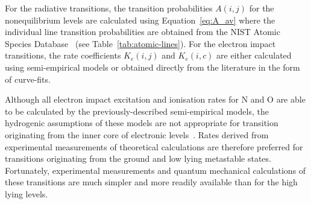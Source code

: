 {For the radiative transitions, the transition probabilities $A(i,j)$ for the nonequilibrium levels are calculated using Equation~\ref{eq:A_av} where the individual line transition probabilities are obtained from the NIST Atomic Species Database~\cite{NIST_ASD} (see Table~\ref{tab:atomic-lines}).
For the electron impact transitions, the rate coefficients $K_e(i,j)$ and $K_e(i,c)$ are either calculated using semi-empirical models or obtained directly from the literature in the form of curve-fits.

\par

Although all electron impact excitation and ionisation rates for N and O are able to be calculated by the previously-described semi-empirical models, the hydrogenic assumptions of these models are not appropriate for transition originating from the inner core of electronic levels~\cite{park_1990}.
Rates derived from experimental measurements of theoretical calculations are therefore preferred for transitions originating from the ground and low lying metastable states.
Fortunately, experimental measurements and quantum mechanical calculations of these transitions are much simpler and more readily available than for the high lying levels.

\par

}
